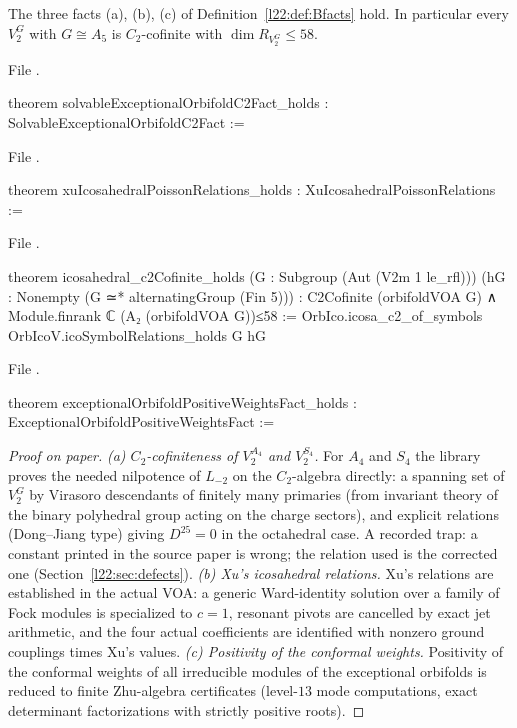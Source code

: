 \begin{theorem}\label{l22:thm:B245}
The three facts (a), (b), (c) of Definition~\ref{l22:def:Bfacts} hold. In particular every $V_2^G$ with $G\cong A_5$ is $C_2$-cofinite with
$\dim R_{V_2^G}\le58$.
\end{theorem}
\noindent File .
\begin{leancode}
theorem solvableExceptionalOrbifoldC2Fact_holds : SolvableExceptionalOrbifoldC2Fact :=
\end{leancode}
\noindent File .
\begin{leancode}
theorem xuIcosahedralPoissonRelations_holds : XuIcosahedralPoissonRelations :=
\end{leancode}
\noindent File .
\begin{leancode}
theorem icosahedral_c2Cofinite_holds
    (G : Subgroup (Aut (V2m 1 le_rfl)))
    (hG : Nonempty (G ≃* alternatingGroup (Fin 5))) :
    C2Cofinite (orbifoldVOA G) ∧ Module.finrank ℂ (A₂ (orbifoldVOA G))≤58 :=
  OrbIco.icosa_c2_of_symbols OrbIcoV.icoSymbolRelations_holds G hG
\end{leancode}
\noindent File .
\begin{leancode}
theorem exceptionalOrbifoldPositiveWeightsFact_holds :
    ExceptionalOrbifoldPositiveWeightsFact :=
\end{leancode}

\begin{proof}[Proof on paper]
\emph{(a) $C_2$-cofiniteness of $V_2^{A_4}$ and $V_2^{S_4}$.} For $A_4$ and $S_4$ the library proves the needed nilpotence of $L_{-2}$ on the $C_2$-algebra directly:
a spanning set of $V_2^G$ by Virasoro descendants of finitely many primaries (from invariant theory of the binary
polyhedral group acting on the charge sectors), and explicit relations (Dong--Jiang type) giving
$D^{25}=0$ in the octahedral case. A recorded trap: a constant printed in the source paper is wrong; the relation used
is the corrected one (Section~\ref{l22:sec:defects}).
\emph{(b) Xu's icosahedral relations.} Xu's relations are established in the actual VOA: a generic Ward-identity solution over a family of Fock
modules is specialized to $c=1$, resonant pivots are cancelled by exact jet arithmetic, and the four actual
coefficients are identified with nonzero ground couplings times Xu's values.
\emph{(c) Positivity of the conformal weights.} Positivity of the conformal weights of all irreducible modules of the exceptional orbifolds is reduced to
finite Zhu-algebra certificates (level-$13$ mode computations, exact determinant factorizations with strictly
positive roots).
\end{proof}

